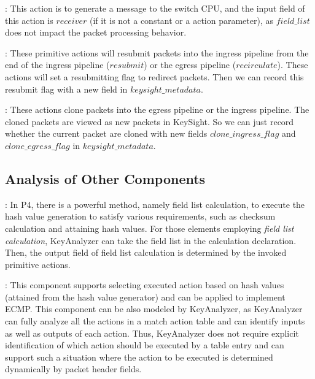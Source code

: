 \documentclass[sigconf, 10pt]{acmart}
\theoremstyle{plain}
\begin{document}
: This action is to generate a message to the switch CPU, and the input field of this action is $receiver$ (if it is not a constant or a action parameter), as $field\_list$ does not impact the packet processing behavior.

 : These primitive actions will resubmit packets into the ingress pipeline from the end of the ingress pipeline ($resubmit$) or the egress pipeline ($recirculate$). These actions will set a resubmitting flag to redirect packets. Then we can record this resubmit flag with a new field in $keysight\_metadata$.

 : These actions clone packets into the egress pipeline or the ingress pipeline. The cloned packets are viewed as new packets in KeySight. So we can just record whether the current packet are cloned with new fields $clone\_ingress\_flag$ and $clone\_egress\_flag$ in $keysight\_metadata$.

\subsection{Analysis of Other Components}


: In P4, there is a powerful method, namely field list calculation, to execute the hash value generation to satisfy various requirements, such as checksum calculation and attaining hash values. For those elements employing \textit{field list calculation}, KeyAnalyzer can take the field list in the calculation declaration. Then, the output field of field list calculation is determined by the invoked primitive actions. 

: This component supports selecting executed action based on hash values (attained from the hash value generator) and can be applied to implement ECMP. This component can be also modeled by KeyAnalyzer, as KeyAnalyzer can fully analyze all the actions in a match action table and can identify inputs as well as outputs of each action. Thus, KeyAnalyzer does not require explicit identification of which action should be executed by a table entry and can support such a situation where the action to be executed is determined dynamically by packet header fields. 
\end{document}
